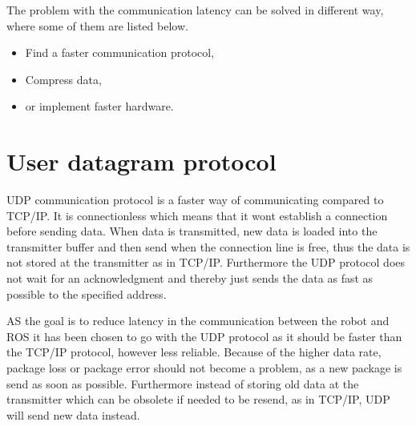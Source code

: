 
The problem with the communication latency can be solved in different way, where some of them are listed below.

\begin{itemize}
	\item Find a faster communication protocol,
	\item Compress data,
	\item or implement faster hardware.	
\end{itemize}

\section*{User datagram protocol}
UDP communication protocol is a faster way of communicating compared to TCP/IP. It is connectionless which means that it wont establish a connection before sending data. When data is transmitted, new data is loaded into the transmitter buffer and then send when the connection line is free, thus the data is not stored at the transmitter as in TCP/IP. Furthermore the UDP protocol does not wait for an acknowledgment and thereby just sends the data as fast as possible to the specified address.

AS the goal is to reduce latency in the communication between the robot and ROS it has been chosen to go with the UDP protocol as it should be faster than the TCP/IP protocol, however less reliable. Because of the higher data rate, package loss or package error should not become a problem, as a new package is send as soon as possible. Furthermore instead of storing old data at the transmitter which can be obsolete if needed to be resend, as in TCP/IP, UDP will send new data instead.



